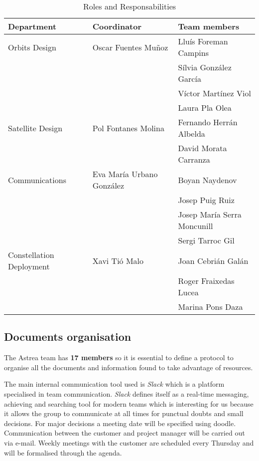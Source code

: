 \begin{table}[h]
\begin{tabular}{ | l | l | p{5cm} |}
\hline
\textbf{Department} & \textbf{Coordinator} & \textbf{Team members} \\ \hline
Orbits Design & Oscar Fuentes Muñoz & Llu\'{i}s Foreman Campins\\ \hline
 & & S\'{i}lvia Gonz\'{a}lez Garc\'{i}a \\ \hline
 & & V\'{i}ctor Mart\'{i}nez Viol \\ \hline
 & & Laura Pla Olea \\ \hline
Satellite Design & Pol Fontanes Molina & Fernando Herr\'{a}n Albelda \\ \hline
 & & David Morata Carranza \\ \hline
Communications & Eva Mar\'{i}a Urbano Gonz\'{a}lez & Boyan Naydenov \\ \hline
 & & Josep Puig Ruiz \\ \hline
 & & Josep Mar\'{i}a Serra Moncunill \\ \hline
 & & Sergi Tarroc Gil \\ \hline
Constellation Deployment & Xavi Ti\'{o} Malo & Joan Cebri\'{a}n Gal\'{a}n \\ \hline
 & & Roger Fraixedas Lucea \\ \hline
 & & Marina Pons Daza \\ \hline

\end{tabular}
\caption{Roles and Responsabilities}
\end{table}
\subsection{Documents organisation}


The Astrea team has \textbf{17 members} so it is essential to define a protocol to organise all the documents and information found to take advantage of resources. 
\newline

The main internal communication tool used is \textit{Slack} which is a platform specialised in team communication. \textit{Slack} defines itself as a real-time messaging, achieving and searching tool for modern teams which is interesting for us because it allows the group to communicate at all times for punctual doubts and small decisions. For major decisions a meeting date will be specified using doodle. Communication between the customer and project manager will be carried out via e-mail. Weekly meetings with the customer are scheduled every Thursday and will be formalised through the agenda.
 \newline

